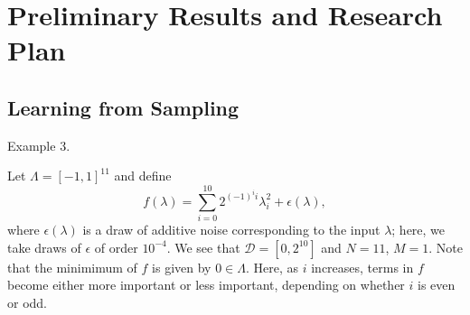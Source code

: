 \documentclass[11pt]{beamer}
\begin{document}
\section{Preliminary Results and Research Plan}



\subsection{Learning from Sampling}

\begin{frame}

\begin{block}{Example 3.}


Let $\Lambda=[-1,1]^{11}$ and define $$f(\lambda)=\sum_{i=0}^{10} 2^{(-1)^i i}\lambda_i^2+\epsilon(\lambda),$$ where $\epsilon(\lambda)$ is a draw of additive noise corresponding to the input $\lambda$; here, we take draws of $\epsilon$ of order $10^{-4}$. We see that $\mathcal{D}=[0,2^{10}]$ and $N=11$, $M=1$. Note that the minimimum of $f$ is given by $0 \in \Lambda$. Here, as $i$ increases, terms in $f$ become either more important or less important, depending on whether $i$ is even or odd.

\end{block}

\end{frame}
\end{document}
